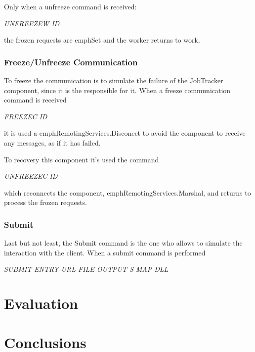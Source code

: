 \documentclass[times, 10pt,twocolumn]{article}
\begin{document}
            Only when a unfreeze command is received:
            
            \emph{UNFREEZEW ID}
            
            the frozen requests are emph{Set} and the worker returns to work.

            \subsubsection{Freeze/Unfreeze Communication}
            To freeze the communication is to simulate the failure of the JobTracker component, since it is the responsible for it. When a freeze communication command is received
            
	        \emph{FREEZEC ID}
	        
	        it is used a emph{RemotingServices.Disconect} to avoid the component to receive any messages, as if it has failed.
	        
	        To recovery this component it's used the command
	        
	        \emph{UNFREEZEC ID}
	        
	        which reconnects the component, emph{RemotingServices.Marshal}, and returns to process the frozen requests.
            
            \subsubsection{Submit}   
            Last but not least, the Submit command is the one who allows to simulate the interaction with the client. When a submit command is performed
            
            \emph{SUBMIT ENTRY-URL FILE OUTPUT S MAP DLL}
            
            
	
	\section{Evaluation}
	
	\section{Conclusions}
	
	
	
\end{document}
